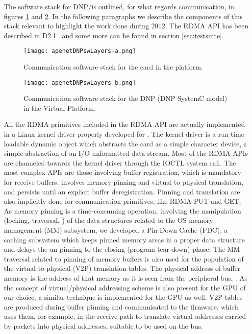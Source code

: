 The software stack for DNP/\apenetp is outlined, for what regards
communication, in figures \ref{fig:apenetsw} and \ref{fig:dnpsw}. In
the following paragraphs we describe the components of this stack
relevant to highlight the work done during 2012. The RDMA API has been 
described in D2.1~\cite{euretile:D2_1} and some more can be found in 
section \ref{sec:testsuite}.
\begin{figure}[!htbp]
\centering
\texttt{[image: apenetDNPswLayers-a.png]}
\caption{Communication software stack for the \apenetp card in the
\quong platform.}
\label{fig:apenetsw}
\end{figure}
\begin{figure}[!htbp]
\centering
\texttt{[image: apenetDNPswLayers-b.png]}
\caption{Communication software stack for the DNP (DNP SystemC model)
in the Virtual \euretile Platform.}
\label{fig:dnpsw}
\end{figure}
All the RDMA primitives included in the RDMA API are actually
implemented in a Linux kernel driver properly developed for
\apenetp. The kernel driver is a run-time loadable dynamic object
which abstracts the \apenetp card as a simple character device, a
simple abstraction of an I/O unformatted data stream. Most of the RDMA
APIs are channeled towards the kernel driver through the IOCTL system
call. The most complex APIs are those involving buffer registration,
which is mandatory for receive buffers, involves memory-pinning and
virtual-to-physical translation, and persists until an explicit buffer
deregistration. Pinning and translation are also implicitly done for
communication primitives, like RDMA PUT and GET.  As memory pinning is
a time-consuming operation, involving the manipulation (locking,
traversal, \etc) of the data structures related to the OS memory
management (MM) subsystem, we developed a Pin-Down Cache (PDC), a
caching subsystem which keeps pinned memory areas in a proper data
structure and delays the un-pinning to the closing (program tear-down)
phase.  The MM traversal related to pinning of memory buffers is also
used for the population of the virtual-to-physical (V2P) translation
tables. The physical address of buffer memory is the address of that
memory as it is seen from the peripheral bus, \PCIe. As
the concept of virtual/physical addressing scheme is also present for
the GPU of our choice, a similar technique is implemented for the GPU
as well. V2P tables are produced during buffer pinning and
communicated to the \apenetp firmware, which uses them, for example,
in the receive path to translate virtual addresses carried by packets
into physical addresses, suitable to be used on the \PCIe bus.

